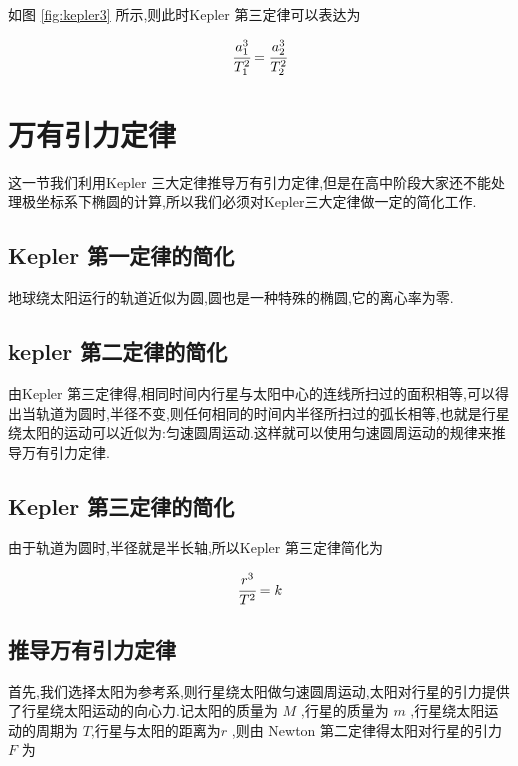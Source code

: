 如图 \ref{fig:kepler3} 所示,则此时Kepler 第三定律可以表达为

\begin{equation}
  \cfrac{a_1^3}{T_1^2}=\cfrac{a_2^3}{T_2^2}
  \label{eq:kepler33}
\end{equation}

\section{万有引力定律}

这一节我们利用Kepler 三大定律推导万有引力定律,但是在高中阶段大家还不能处理极坐标系下椭圆的计算,所以我们必须对Kepler三大定律做一定的简化工作.

\subsection{Kepler 第一定律的简化}

地球绕太阳运行的轨道近似为圆,圆也是一种特殊的椭圆,它的离心率为零.

\subsection{kepler 第二定律的简化}

由Kepler 第三定律得,相同时间内行星与太阳中心的连线所扫过的面积相等,可以得出当轨道为圆时,半径不变,则任何相同的时间内半径所扫过的弧长相等,也就是行星绕太阳的运动可以近似为:匀速圆周运动.这样就可以使用匀速圆周运动的规律来推导万有引力定律.

\subsection{Kepler 第三定律的简化}

由于轨道为圆时,半径就是半长轴,所以Kepler 第三定律简化为

\begin{equation}
  \cfrac{r^3}{T^2}=k
  \label{eq:kepler3jianhua}
\end{equation}

\subsection{推导万有引力定律}
 
首先,我们选择太阳为参考系,则行星绕太阳做匀速圆周运动,太阳对行星的引力提供了行星绕太阳运动的向心力.记太阳的质量为 $M$ ,行星的质量为 $m$ ,行星绕太阳运动的周期为 $T$,行星与太阳的距离为$r$ ,则由 Newton 第二定律得太阳对行星的引力 $F$ 为

